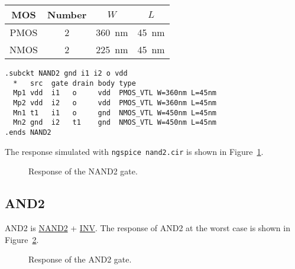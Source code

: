 \documentclass{scrartcl}
\newcommand{\includeres}[1]{\sffamily\scriptsize\vspace{-2em}}
\begin{document}
      \begin{minipage}[b]{\linewidth}
        \centering
        \begin{minipage}[b]{.45\linewidth}
          \centering
          
          \label{fig:nand2}
        \end{minipage}
        \begin{minipage}[b]{.45\linewidth}
          \centering
          \begin{tabular}{cccc}
            \toprule
            MOS & Number & $W$ & $L$ \\\midrule
            PMOS & 2 & \qty{360}{nm} & \qty{45}{nm} \\
            NMOS & 2 & \qty{225}{nm} & \qty{45}{nm} \\
            \bottomrule
          \end{tabular}
          \label{tab:nand2}
        \end{minipage}
      \end{minipage}

      \begin{lstlisting}[title={NAND2 Subcircuit}]
.subckt NAND2 gnd i1 i2 o vdd
  *   src  gate drain body type
  Mp1 vdd  i1   o     vdd  PMOS_VTL W=360nm L=45nm
  Mp2 vdd  i2   o     vdd  PMOS_VTL W=360nm L=45nm
  Mn1 t1   i1   o     gnd  NMOS_VTL W=450nm L=45nm
  Mn2 gnd  i2   t1    gnd  NMOS_VTL W=450nm L=45nm
.ends NAND2
      \end{lstlisting}

      The response simulated with \texttt{ngspice nand2.cir} is shown in Figure~\ref{fig:nand2_res}.
      \begin{figure}[htbp]
        \includeres{nand2}
        \caption{Response of the NAND2 gate.}
        \label{fig:nand2_res}
      \end{figure}

    \vspace*{-.5em}
    \subsection{AND2}

      AND2 is \hyperref[s:nand2]{NAND2} + \hyperref[s:inv]{INV}.
      The response of AND2 at the worst case is shown in Figure~\ref{fig:and2}.
      \vspace*{-.5em}
      \begin{figure}[!h]
        \includeres{and2}
        \caption{Response of the AND2 gate.}
        \label{fig:and2}
        \vspace*{-1em}
      \end{figure}
\end{document}

